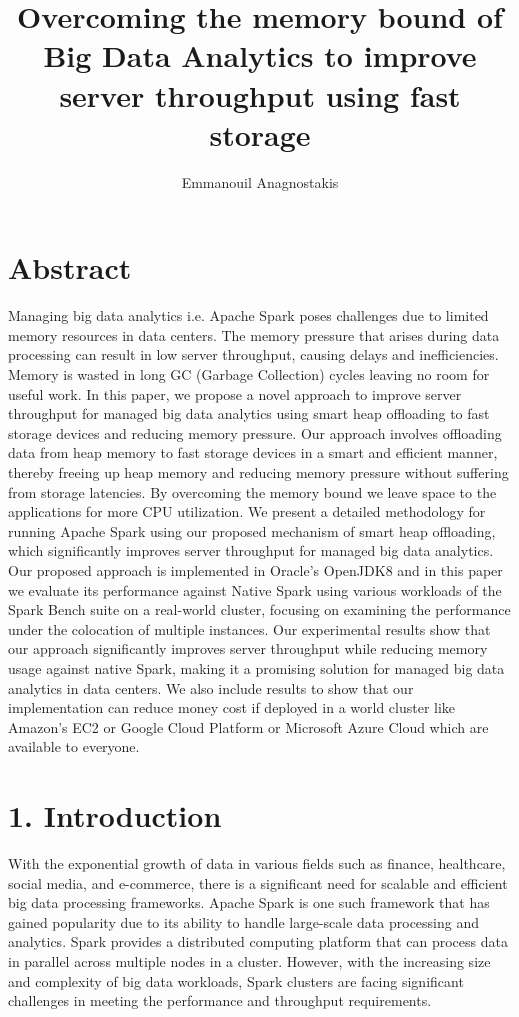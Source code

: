 \documentclass[twocolumn,10pt]{asme2e}
\title{Overcoming the memory bound of Big Data Analytics to improve server throughput using fast storage}
\author{Emmanouil Anagnostakis
    \affiliation{
	    Graduate Research Assistant\\
	    Computer Architecture and VLSI Systems Laboratory, ICS-FORTH\\
	    Heraklion, Greece\\
      manosanag@ics.forth.gr
    }	
}
\begin{document}
\maketitle    

\section*{Abstract}

Managing big data analytics i.e. Apache Spark poses challenges due to limited memory resources in data centers. The memory pressure that arises during data processing can result in low server throughput, causing delays and inefficiencies. Memory is wasted in long GC (Garbage Collection) cycles leaving no room for useful work. In this paper, we propose a novel approach to improve server throughput for managed big data analytics using smart heap offloading to fast storage devices and reducing memory pressure. Our approach involves offloading data from heap memory to fast storage devices in a smart and efficient manner, thereby freeing up heap memory and reducing memory pressure without suffering from storage latencies. By overcoming the memory bound we leave space to the applications for more CPU utilization. We present a detailed methodology for running Apache Spark using our proposed mechanism of smart heap offloading, which significantly improves server throughput for managed big data analytics. Our proposed approach is implemented in Oracle's OpenJDK8 and in this paper we evaluate its performance against Native Spark using various workloads of the Spark Bench suite on a real-world cluster, focusing on examining the performance under the colocation of multiple instances. Our experimental results show that our approach significantly improves server throughput while reducing memory usage against native Spark, making it a promising solution for managed big data analytics in data centers. We also include results to show that our implementation can reduce money cost if deployed in a world cluster like Amazon's EC2 or Google Cloud Platform or Microsoft Azure Cloud which are available to everyone. 

\section*{1. Introduction}

With the exponential growth of data in various fields such as finance, healthcare, social media, and e-commerce, there is a significant need for scalable and efficient big data processing frameworks. Apache Spark \cite{Spark} is one such framework that has gained popularity due to its ability to handle large-scale data processing and analytics. Spark provides a distributed computing platform that can process data in parallel across multiple nodes in a cluster. However, with the increasing size and complexity of big data workloads, Spark clusters are facing significant challenges in meeting the performance and throughput requirements.
\end{document}
